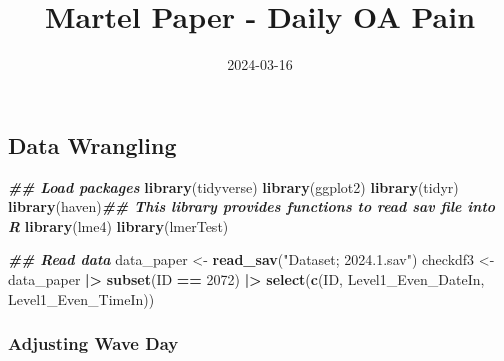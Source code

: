 \documentclass[
  12pt,
]{article}
\title{Martel Paper - Daily OA Pain}
\author{}
\date{\vspace{-2.5em}2024-03-16}
\newenvironment{Shaded}{\begin{snugshade}}{\end{snugshade}}
\newcommand{\DecValTok}[1]{\textcolor[rgb]{0.00,0.00,0.81}{#1}}
\newcommand{\DocumentationTok}[1]{\textcolor[rgb]{0.56,0.35,0.01}{\textbf{\textit{#1}}}}
\newcommand{\FunctionTok}[1]{\textcolor[rgb]{0.13,0.29,0.53}{\textbf{#1}}}
\newcommand{\NormalTok}[1]{#1}
\newcommand{\OtherTok}[1]{\textcolor[rgb]{0.56,0.35,0.01}{#1}}
\newcommand{\SpecialCharTok}[1]{\textcolor[rgb]{0.81,0.36,0.00}{\textbf{#1}}}
\newcommand{\StringTok}[1]{\textcolor[rgb]{0.31,0.60,0.02}{#1}}
\begin{document}
\maketitle

\hypertarget{data-wrangling}{%
\subsection{Data Wrangling}\label{data-wrangling}}

\begin{Shaded}
\begin{Highlighting}[]
\DocumentationTok{\#\# Load packages}
\FunctionTok{library}\NormalTok{(tidyverse)}
\FunctionTok{library}\NormalTok{(ggplot2)}
\FunctionTok{library}\NormalTok{(tidyr)}
\FunctionTok{library}\NormalTok{(haven)}\DocumentationTok{\#\# This library provides functions to read sav file into R}
\FunctionTok{library}\NormalTok{(lme4)}
\FunctionTok{library}\NormalTok{(lmerTest)}
\end{Highlighting}
\end{Shaded}

\begin{Shaded}
\begin{Highlighting}[]
\DocumentationTok{\#\# Read data}
\NormalTok{data\_paper }\OtherTok{\textless{}{-}} \FunctionTok{read\_sav}\NormalTok{(}\StringTok{"Dataset; 2024.1.sav"}\NormalTok{)}
\NormalTok{checkdf3 }\OtherTok{\textless{}{-}}\NormalTok{ data\_paper }\SpecialCharTok{|\textgreater{}} 
  \FunctionTok{subset}\NormalTok{(ID }\SpecialCharTok{==} \DecValTok{2072}\NormalTok{) }\SpecialCharTok{|\textgreater{}} 
  \FunctionTok{select}\NormalTok{(}\FunctionTok{c}\NormalTok{(ID, }
\NormalTok{           Level1\_Even\_DateIn, }
\NormalTok{           Level1\_Even\_TimeIn))}
\end{Highlighting}
\end{Shaded}

\hypertarget{adjusting-wave-day}{%
\subsubsection{Adjusting Wave Day}\label{adjusting-wave-day}}
\end{document}
